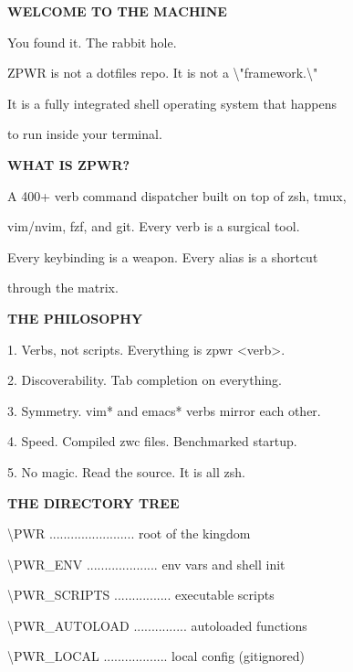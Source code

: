 \documentclass[11pt,a4paper,twoside]{book}
\begin{document}
\vspace{10pt}
{\large\bfseries\color{neoncyan} WELCOME TO THE MACHINE}\vspace{6pt}

You found it. The rabbit hole.

ZPWR is not a dotfiles repo. It is not a \textbackslash{}"framework.\textbackslash{}"

It is a fully integrated shell operating system that happens

to run inside your terminal.


\vspace{12pt}
{\bfseries\color{neonyellow} WHAT IS ZPWR?}\vspace{4pt}

A 400+ verb command dispatcher built on top of zsh, tmux,

vim/nvim, fzf, and git. Every verb is a surgical tool.

Every keybinding is a weapon. Every alias is a shortcut

through the matrix.


\vspace{12pt}
{\bfseries\color{neonyellow} THE PHILOSOPHY}\vspace{4pt}

\begin{codebox}
1. Verbs, not scripts. Everything is zpwr <verb>.\\
\end{codebox}

2. Discoverability.   Tab completion on everything.

3. Symmetry.          vim* and emacs* verbs mirror each other.

4. Speed.             Compiled zwc files. Benchmarked startup.

5. No magic.          Read the source. It is all zsh.


\vspace{12pt}
{\bfseries\color{neonyellow} THE DIRECTORY TREE}\vspace{4pt}

\textbackslash{}PWR ........................ root of the kingdom

\textbackslash{}PWR\_ENV .................... env vars and shell init

\textbackslash{}PWR\_SCRIPTS ................ executable scripts

\textbackslash{}PWR\_AUTOLOAD ............... autoloaded functions

\textbackslash{}PWR\_LOCAL .................. local config (gitignored)
\end{document}
